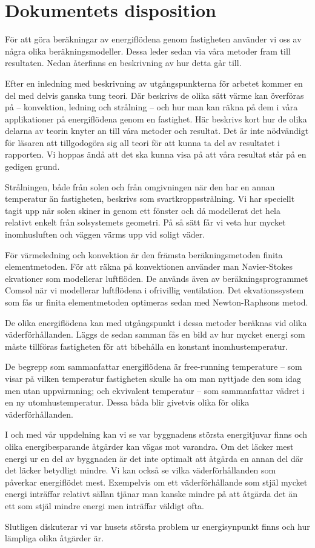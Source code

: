 \section{Dokumentets disposition}

För att göra beräkningar av energiflödena genom fastigheten använder vi oss av några olika beräkningsmodeller. Dessa leder sedan via våra metoder fram till resultaten. Nedan återfinns en beskrivning av hur detta går till.

Efter en inledning med beskrivning av utgångspunkterna för arbetet kommer en del med
 delvis ganska tung teori. Där beskrivs de olika sätt värme kan överföras på – konvektion,
  ledning och strålning – och hur man kan räkna på dem i våra applikationer på 
  energiflödena genom en fastighet. Här beskrivs kort hur de olika delarna av teorin 
  knyter an till våra metoder och resultat. Det är inte nödvändigt för läsaren att 
  tillgodogöra sig all teori för att kunna ta del av resultatet i rapporten. Vi hoppas ändå att 
  det ska kunna visa på att våra resultat står på en gedigen grund.

Strålningen, både från solen och från omgivningen när den har en annan temperatur än fastigheten, beskrivs som 
svartkroppsstrålning. Vi har speciellt tagit upp när solen skiner in genom ett fönster och då 
modellerat det hela relativt enkelt från solsystemets geometri. På så sätt får vi veta hur 
mycket inomhusluften och väggen värms upp vid soligt väder.

För värmeledning och konvektion är den främsta beräkningsmetoden finita 
elementmetoden. För att räkna på konvektionen använder man Navier-Stokes ekvationer 
som modellerar luftflöden. De används även av beräkningsprogrammet Comsol när vi 
modellerar luftflödena i ofrivillig ventilation. Det ekvationssystem som fås ur finita
 elementmetoden optimeras sedan med Newton-Raphsons metod.

De olika energiflödena kan med utgångspunkt i dessa metoder beräknas vid olika väderförhållanden. Läggs de 
sedan samman fås en bild av hur mycket energi som måste tillföras fastigheten för att 
bibehålla en konstant inomhustemperatur.

De begrepp som sammanfattar energiflödena är free-running temperature – som visar på 
vilken temperatur fastigheten skulle ha om man nyttjade den som idag men utan 
uppvärmning; och ekvivalent temperatur – som sammanfattar vädret i en ny utomhustemperatur. Dessa båda blir givetvis olika för olika väderförhållanden.

I och med vår uppdelning kan vi se var byggnadens största energitjuvar finns och 
olika energibesparande åtgärder kan vägas mot varandra. Om det läcker mest energi ur
 en del av byggnaden är det inte optimalt att åtgärda en annan del där det läcker betydligt
  mindre. Vi kan också se vilka väderförhållanden som påverkar energiflödet mest. 
Exempelvis om ett väderförhållande som stjäl mycket energi inträffar relativt sällan tjänar
 man kanske mindre på att åtgärda det än ett som stjäl mindre energi men inträffar väldigt 
 ofta.

Slutligen diskuterar vi var husets största problem ur energisynpunkt finns och hur lämpliga olika åtgärder är.
